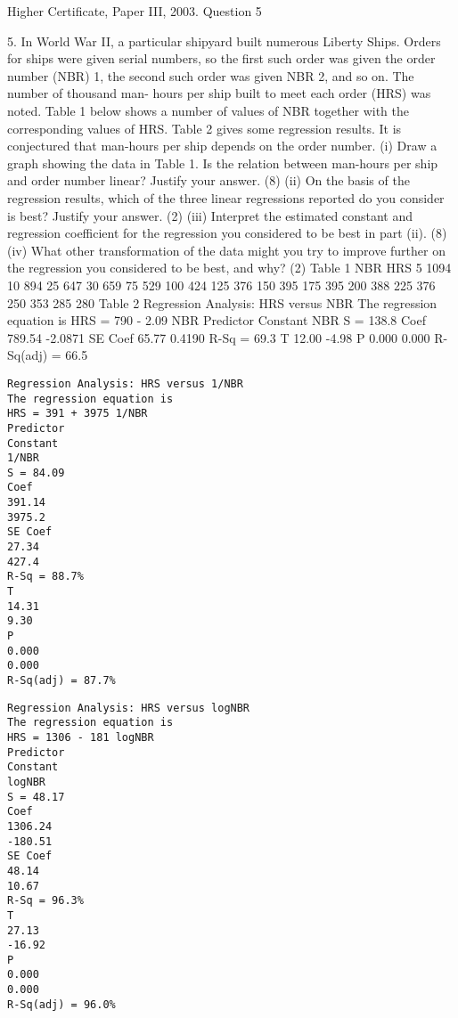 \documentclass[a4paper,12pt]{article}
\begin{document}
Higher Certificate, Paper III, 2003. Question 5

\begin{framed}
5.
In World War II, a particular shipyard built numerous Liberty Ships. Orders for ships
were given serial numbers, so the first such order was given the order number (NBR)
1, the second such order was given NBR 2, and so on. The number of thousand man-
hours per ship built to meet each order (HRS) was noted. Table 1 below shows a
number of values of NBR together with the corresponding values of HRS. Table 2
gives some regression results.
It is conjectured that man-hours per ship depends on the order number.
(i) Draw a graph showing the data in Table 1. Is the relation between man-hours
per ship and order number linear? Justify your answer.
(8)
(ii) On the basis of the regression results, which of the three linear regressions
reported do you consider is best? Justify your answer.
(2)
(iii) Interpret the estimated constant and regression coefficient for the regression
you considered to be best in part (ii).
(8)
(iv) What other transformation of the data might you try to improve further on the
regression you considered to be best, and why?
(2)
Table 1
NBR
HRS
5
1094
10
894
25
647
30
659
75
529
100
424
125
376
150
395
175
395
200
388
225
376
250
353
285
280
Table 2
Regression Analysis: HRS versus NBR
The regression equation is
HRS = 790 - 2.09 NBR
Predictor
Constant
NBR
S = 138.8
Coef
789.54
-2.0871
SE Coef
65.77
0.4190
R-Sq = 69.3%
T
12.00
-4.98
P
0.000
0.000
R-Sq(adj) = 66.5%
\begin{verbatim}
Regression Analysis: HRS versus 1/NBR
The regression equation is
HRS = 391 + 3975 1/NBR
Predictor
Constant
1/NBR
S = 84.09
Coef
391.14
3975.2
SE Coef
27.34
427.4
R-Sq = 88.7%
T
14.31
9.30
P
0.000
0.000
R-Sq(adj) = 87.7%
\end{verbatim}
\begin{verbatim}
Regression Analysis: HRS versus logNBR
The regression equation is
HRS = 1306 - 181 logNBR
Predictor
Constant
logNBR
S = 48.17
Coef
1306.24
-180.51
SE Coef
48.14
10.67
R-Sq = 96.3%
T
27.13
-16.92
P
0.000
0.000
R-Sq(adj) = 96.0%
\end{verbatim}
\end{framed}
\end{document}
